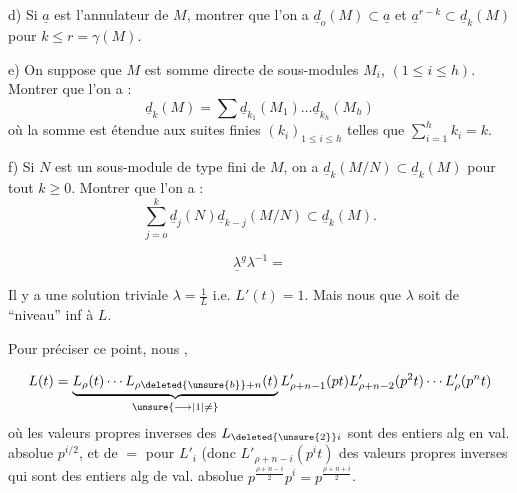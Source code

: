 d) Si $\underline{a}$ est l'annulateur de $M$, montrer que l'on a $\underline{d}_o(M)\subset \underline{a}$ et $\underline{a}^{r-k}\subset \underline{d}_k(M)$ pour $k\leq r=\gamma(M)$.

e) On suppose que $M$ est somme directe de sous-modules $M_i$, $(1\leq i\leq h)$. Montrer que l'on a :
\[
\underline{d}_k(M)=\sum \underline{d}_{k_1}(M_1)\ldots \underline{d}_{k_h}(M_h)
\]
où la somme est étendue aux suites finies $(k_i)_{1\leq i\leq h}$ telles que $\sum_{i=1}^{h}k_i=k$.

f) Si $N$ est un sous-module de type fini de $M$, on a $\underline{d}_k(M/N)\subset \underline{d}_k(M)$ pour tout $k\geq0$. Montrer que l'on a :
\[
\sum_{j=o}^{k}\underline{d}_j(N)\underline{d}_{k-j}(M/N)\subset \underline{d}_k(M).
\]

\[
\boxed{\underline{\lambda}^{g}\lambda^{-1}=}
\]

Il y a une solution triviale $\lambda=\frac{1}{L}$ i.e. $L'(t)=1$. Mais nous    que $\lambda$  soit de ``niveau''  inf à $L$.

Pour préciser ce point, nous ,

\[
L(t)=\underbrace{L_{\rho}(t)\cdots L_{\rho\deleted{\unsure{b}}+n}(t)}_{\unsure{\longrightarrow|1|\ne}}L'_{\rho+n-1}(pt)L'_{\rho+n-2}(p^2t)\cdots L'_{\rho}(p^nt)
\]
où les valeurs propres inverses des $L_{\deleted{\unsure{2}}i}$ sont  des entiers alg en val. absolue $p^{i/2}$, et de $=$ pour $L'_i$ (donc $L'_{\rho+n-i}(p^it)$  des valeurs propres inverses qui sont des entiers alg de val. absolue $p^{\frac{\rho+n-i}{2}}p^i=p^{\frac{\rho+n+i}{2}}$.


